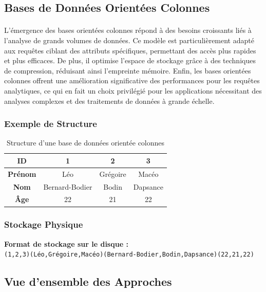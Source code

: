\documentclass[11pt]{extarticle}
\begin{document}
\subsection{Bases de Données Orientées Colonnes}

\paragraph{}    L’émergence des bases orientées colonnes répond à des besoins croissants liés à l’analyse de grands volumes de données. Ce modèle est particulièrement adapté aux requêtes ciblant des attributs spécifiques, permettant des accès plus rapides et plus efficaces. De plus, il optimise l’espace de stockage grâce à des techniques de compression, réduisant ainsi l’empreinte mémoire. Enfin, les bases orientées colonnes offrent une amélioration significative des performances pour les requêtes analytiques, ce qui en fait un choix privilégié pour les applications nécessitant des analyses complexes et des traitements de données à grande échelle.

\subsubsection{Exemple de Structure}
\begin{table}[H]
    \centering
    \begin{tabular}{|c|c|c|c|}
    \hline
    \textbf{ID} & 1 & 2 & 3 \\
    \hline
    \textbf{Prénom} & Léo & Grégoire & Macéo \\
    \hline
    \textbf{Nom} & Bernard-Bodier & Bodin & Dapsance \\
    \hline
    \textbf{Âge} & 22 & 21 & 22 \\
    \hline
    \end{tabular}
    \caption{Structure d'une base de données orientée colonnes}
    \label{tab:column_oriented}
\end{table}

\subsubsection{Stockage Physique}
\noindent\textbf{Format de stockage sur le disque :}\\
\texttt{(1,2,3)(Léo,Grégoire,Macéo)(Bernard-Bodier,Bodin,Dapsance)(22,21,22)}

\subsection{Vue d'ensemble des Approches}
\end{document}
